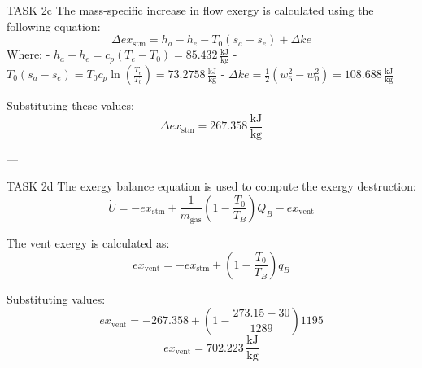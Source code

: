 TASK 2c  
The mass-specific increase in flow exergy is calculated using the following equation:  
\[
\Delta ex_{\text{stm}} = h_a - h_e - T_0 (s_a - s_e) + \Delta ke
\]  
Where:  
- \( h_a - h_e = c_p (T_e - T_0) = 85.432 \, \frac{\text{kJ}}{\text{kg}} \)  
- \( T_0 (s_a - s_e) = T_0 c_p \ln \left( \frac{T_e}{T_0} \right) = 73.2758 \, \frac{\text{kJ}}{\text{kg}} \)  
- \( \Delta ke = \frac{1}{2} (w_6^2 - w_0^2) = 108.688 \, \frac{\text{kJ}}{\text{kg}} \)  

Substituting these values:  
\[
\Delta ex_{\text{stm}} = 267.358 \, \frac{\text{kJ}}{\text{kg}}
\]  

---

TASK 2d  
The exergy balance equation is used to compute the exergy destruction:  
\[
\dot{U} = - ex_{\text{stm}} + \frac{1}{\dot{m}_{\text{gas}}} \left( 1 - \frac{T_0}{T_B} \right) Q_B - ex_{\text{vent}}
\]  

The vent exergy is calculated as:  
\[
ex_{\text{vent}} = - ex_{\text{stm}} + \left( 1 - \frac{T_0}{T_B} \right) q_B
\]  

Substituting values:  
\[
ex_{\text{vent}} = -267.358 + \left( 1 - \frac{273.15 - 30}{1289} \right) 1195
\]  
\[
ex_{\text{vent}} = 702.223 \, \frac{\text{kJ}}{\text{kg}}
\]
